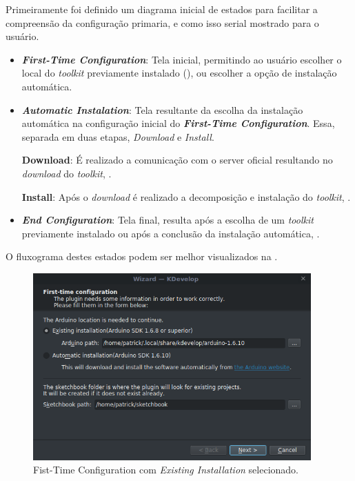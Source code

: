 Primeiramente foi definido um diagrama inicial de estados para facilitar a compreensão da configuração primaria, e como isso serial mostrado para o usuário.

\begin{itemize}
\item \textbf{\textit{First-Time Configuration}}: Tela inicial, permitindo ao usuário escolher o local do \textit{toolkit} previamente instalado (), ou escolher a opção de instalação automática. 

\item \textbf{\textit{Automatic Instalation}}: Tela resultante da escolha da instalação automática na configuração inicial do \textbf{\textit{First-Time Configuration}}. Essa, separada em duas etapas, \textit{Download} e \textit{Install}.

\subitem \textbf{Download}: É realizado a comunicação com o server oficial resultando no \textit{download} do \textit{toolkit}, .

\subitem \textbf{Install}: Após o \textit{download} é realizado a decomposição e instalação do \textit{toolkit}, .

\item \textbf{\textit{End Configuration}}: Tela final, resulta após a escolha de um \textit{toolkit} previamente instalado ou após a conclusão da instalação automática, .
\end{itemize}

O fluxograma destes estados podem ser melhor visualizados na .

\begin{figure}[!htb]
  \centering
  \caption[Fist-Time Configuration]{Fist-Time Configuration com \textit{Existing Installation} selecionado.}
  \label{fig:kdevelopinstaller1}
  \includegraphics[width=0.95\textwidth]{figuras/kdevelopInstaller1.png}
\end{figure}

